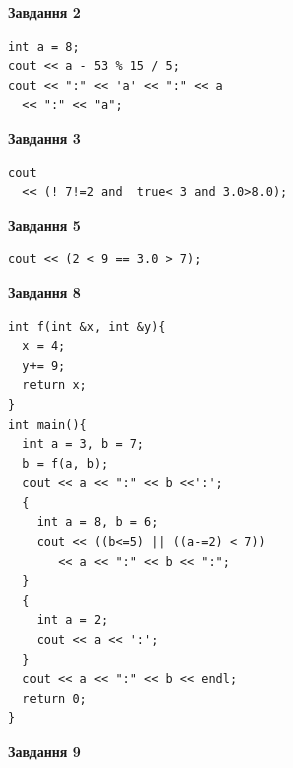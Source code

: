 \documentclass[12pt, ukrainian]{article}
\begin{document}
{\begin {large}
\begin{minipage}[t]{7.0cm}
\end{minipage}
\vline \hspace{1mm}
\begin{minipage}[t]{11.0cm}

\begin{center}
\textbf{Завдання 2}
\end{center}
\vspace{-8mm}

\begin{verbatim}
int a = 8;
cout << a - 53 % 15 / 5;
cout << ":" << 'a' << ":" << a 
  << ":" << "a";
\end{verbatim}



\begin{center}
\textbf{Завдання 3}
\end{center}
\vspace{-8mm}

\begin{verbatim}
cout 
  << (! 7!=2 and  true< 3 and 3.0>8.0);
\end{verbatim}



\begin{center}
\textbf{Завдання 5}
\end{center}
\vspace{-8mm}

\begin{verbatim}
cout << (2 < 9 == 3.0 > 7);
\end{verbatim}



\begin{center}
\textbf{Завдання 8}
\end{center}
\vspace{-8mm}

\begin{verbatim}
int f(int &x, int &y){
  x = 4;
  y+= 9;
  return x;
}
int main(){
  int a = 3, b = 7;
  b = f(a, b);
  cout << a << ":" << b <<':';
  {
    int a = 8, b = 6;
    cout << ((b<=5) || ((a-=2) < 7))
       << a << ":" << b << ":";
  }
  {
    int a = 2;
    cout << a << ':';
  }
  cout << a << ":" << b << endl;
  return 0;
}
\end{verbatim}

\end{minipage}


\begin{minipage}[t]{7.0cm}

\begin{center}
\textbf{Завдання 9}
\end{center}
\vspace{-8mm}


\end{minipage}
\end{large}}
\end{document}
